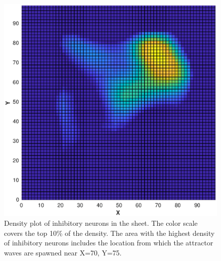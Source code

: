 \begin{figure}[!htb]
 \caption{ Density plot of inhibitory neurons in the sheet. The color scale covers the top 10\% of the density.
           The area with the highest density of inhibitory neurons includes the location from which the attractor waves are spawned near X=70, Y=75. }
 \label{fig:2DAttractor_InhibDensity}
 \centering
   \includegraphics[width=\textwidth]{fig/2DAttractor_seed35_InhibitoryDensity}
\end{figure}

\FloatBarrier

